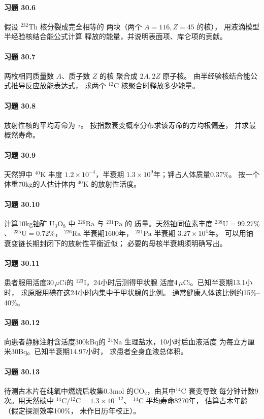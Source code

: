 \paragraph{习题 30.6}
假设 \({}^{232}\mathrm{Th}\) 核分裂成完全相等的
两块（两个 \(A=116,Z=45\) 的核），
用液滴模型半经验核结合能公式计算
释放的能量，并说明表面项、库仑项的贡献。
\paragraph{习题 30.7}
两枚相同质量数 \(A\)、质子数 \(Z\) 的核
聚合成 \(2A,2Z\) 原子核。
由半经验核结合能公式推导反应放能表达式，
求两个 \({}^{12}\mathrm C\) 核聚合时释放多少能量。
\paragraph{习题 30.8}
放射性核的平均寿命为 \(\tau\)。
按指数衰变概率分布求该寿命的方均根偏差，
并求最概然寿命。
\paragraph{习题 30.9}
天然钾中 \({}^{40}\mathrm K\) 丰度
\(1.2\times10^{-4}\)，半衰期
\(1.3\times10^9\)年；钾占人体质量0.37\%。
按一个体重70kg的人估计体内
\({}^{40}\mathrm K\) 的放射性活度。
\paragraph{习题 30.10}
计算10kg铀矿 \(\mathrm U_3\mathrm O_8\) 中
\({}^{226}\mathrm{Ra}\) 与 \({}^{231}\mathrm{Pa}\) 的
质量。天然铀同位素丰度
\({}^{238}\mathrm U=99.27\%\)、
\({}^{235}\mathrm U=0.72\%\)，
\({}^{226}\mathrm{Ra}\) 半衰期1600年，
\({}^{231}\mathrm{Pa}\) 半衰期
\(3.27\times10^4\)年。
可以用铀衰变链长期封闭下的放射性平衡近似；
必要的母核半衰期须明确写出。
\paragraph{习题 30.11}
患者服用活度30\,$\mu$Ci的
\({}^{123}\mathrm I\)，24小时后测得甲状腺
活度4\,$\mu$Ci。已知半衰期13.1小时，
求原服用碘在这24小时内集中于甲状腺的比例。
通常健康人体该比例约15\%--40\%。
\paragraph{习题 30.12}
向患者静脉注射含活度300kBq的
\({}^{24}\mathrm{Na}\) 生理盐水，10小时后血液活度
为每立方厘米30Bq。已知半衰期14.97小时，
求患者全身血液总体积。
\paragraph{习题 30.13}
待测古木片在纯氧中燃烧后收集0.3mol
的CO$_2$，由其中\({}^{14}\mathrm C\) 衰变导致
每分钟计数9次。用天然碳中
\({}^{14}\mathrm C/{}^{12}\mathrm C=1.3\times10^{-12}\)、
\({}^{14}\mathrm C\) 平均寿命8270年，
估算古木年龄（假定探测效率100\%，
未作日历年校正）。
